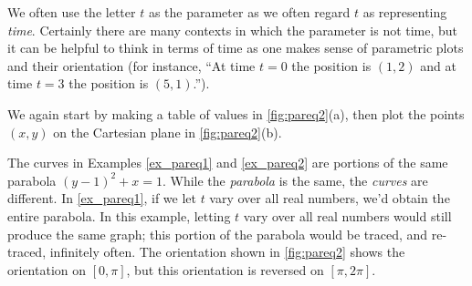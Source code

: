 We often use the letter $t$ as the parameter as we often regard $t$ as representing \textit{time}. Certainly there are many contexts in which the parameter is not time, but it can be helpful to think in terms of time as one makes sense of parametric plots and their orientation (for instance, ``At time $t=0$ the position is $(1,2)$ and at time $t=3$ the position is $(5,1)$.'').

{We again start by making a table of values in \autoref{fig:pareq2}(a), then plot the points $(x,y)$ on the Cartesian plane in \autoref{fig:pareq2}(b).

The curves in Examples \ref{ex_pareq1} and \ref{ex_pareq2} are portions of the same parabola $(y-1)^2+x=1$. While the \textit{parabola} is the same, the \textit{curves} are different. In \autoref{ex_pareq1}, if we let $t$ vary over all real numbers, we'd obtain the entire parabola. In this example, letting $t$ vary over all real numbers would still produce the same graph; this portion of the parabola would be traced, and re-traced, infinitely often. The orientation shown in \autoref{fig:pareq2} shows the orientation on $[0,\pi]$, but this orientation is reversed on $[\pi,2\pi]$.}

